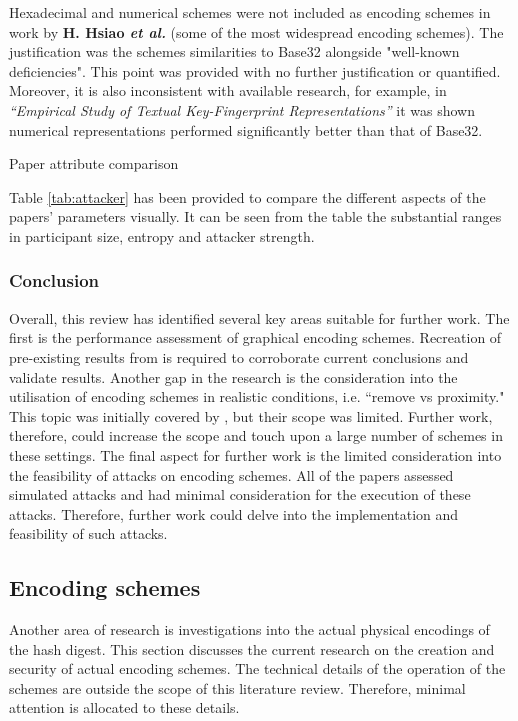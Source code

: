 Hexadecimal and numerical schemes were not included as encoding schemes in work by \textbf{H. Hsiao \textit{et al.}}\cite{hsiao2009study} (some of the most widespread encoding schemes). The justification was the schemes similarities to Base32  alongside "well-known deficiencies". This point was provided with no further justification or quantified. Moreover, it is also inconsistent with available research, for example, in \textit{``Empirical Study of Textual Key-Fingerprint Representations''}\cite{dechand2016empirical} it was shown numerical representations performed significantly better than that of Base32.

\begin{table}[h!]
    \makebox[\textwidth][c]{
        
    }%
    \caption{Paper attribute comparison}
    \label{tab:attacker}
\end{table}

Table \ref{tab:attacker} has been provided to compare the different aspects of the papers' parameters visually. It can be seen from the table the substantial ranges in participant size, entropy and attacker strength.

\subsubsection*{Conclusion}
Overall, this review has identified several key areas suitable for further work.
The first is the performance assessment of graphical encoding schemes. Recreation of pre-existing results from \cite{hsiao2009study}\cite{tan2017can} is required to corroborate current conclusions and validate results.
Another gap in the research is the consideration into the utilisation of encoding schemes in realistic conditions, i.e. ``remove vs proximity." This topic was initially covered by \cite{shirvanian2017pitfalls}, but their scope was limited. Further work, therefore, could increase the scope and touch upon a large number of schemes in these settings. The final aspect for further work is the limited consideration into the feasibility of attacks on encoding schemes. All of the papers assessed simulated attacks and had minimal consideration for the execution of these attacks. Therefore, further work could delve
into the implementation and feasibility of such attacks.

\subsection{Encoding schemes}
Another area of research is investigations into the actual physical encodings of the hash digest. This section discusses the current research on the creation and security of actual encoding schemes. The technical details of the operation of the schemes are outside the scope of this literature review. Therefore, minimal attention is allocated to these details.

